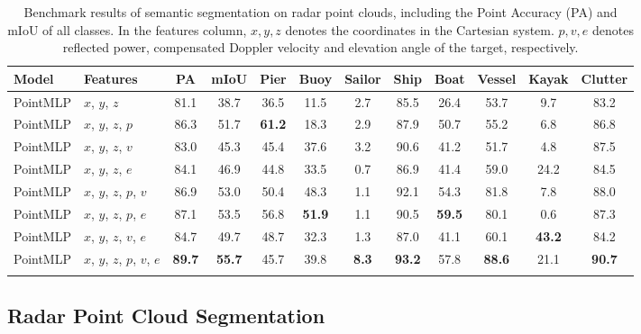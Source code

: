 \documentclass[lettersize,journal]{IEEEtran}
\begin{document}
\begin{table*}[!h]
\caption{Benchmark results of semantic segmentation on radar point clouds, including the Point Accuracy (PA) and mIoU of all classes. In the features column, $x, y, z$ denotes the coordinates in the Cartesian system. $p, v, e$ denotes reflected power, compensated Doppler velocity and elevation angle of the target, respectively.}
\center
\footnotesize
\begin{tabular}{ll|cc|cccccccc}
\toprule


\bf{Model} & \bf{Features} & \bf{PA} & \bf{mIoU} & \bf{Pier} & \bf{Buoy} & \bf{Sailor} & \bf{Ship} & \bf{Boat} & \bf{Vessel} & \bf{Kayak} & \bf{Clutter}  \\\midrule

PointMLP \cite{ma2022rethinking} & $x$, $y$, $z$ & 81.1 & 38.7 & 36.5 & 11.5 & 2.7 & 85.5 & 26.4 & 53.7 & 9.7 & 83.2\\
PointMLP \cite{ma2022rethinking} & $x$, $y$, $z$, $p$ & 86.3 & 51.7 & \textbf{61.2} & 18.3 & 2.9 & 87.9 & 50.7 & 55.2 & 6.8 & 86.8 \\
PointMLP \cite{ma2022rethinking} & $x$, $y$, $z$, $v$ & 83.0 &  45.3 & 45.4 & 37.6 & 3.2 & 90.6 & 41.2 & 51.7 & 4.8 & 87.5 \\
PointMLP \cite{ma2022rethinking} & $x$, $y$, $z$, $e$ & 84.1 &  46.9 & 44.8 & 33.5 & 0.7 & 86.9 & 41.4 & 59.0 & 24.2 & 84.5 \\
PointMLP \cite{ma2022rethinking} & $x$, $y$, $z$, $p$, $v$ & 86.9 & 53.0 & 50.4 & 48.3 & 1.1 & 92.1 & 54.3 & 81.8 & 7.8 & 88.0 \\
PointMLP \cite{ma2022rethinking} & $x$, $y$, $z$, $p$, $e$ & 87.1 & 53.5 & 56.8 & \textbf{51.9} & 1.1 & 90.5 & \textbf{59.5} & 80.1 & 0.6 & 87.3 \\
PointMLP \cite{ma2022rethinking} & $x$, $y$, $z$, $v$, $e$ & 84.7 & 49.7 & 48.7 & 32.3 & 1.3 & 87.0 & 41.1 & 60.1 & \textbf{43.2} & 84.2 \\
PointMLP \cite{ma2022rethinking} & $x$, $y$, $z$, $p$, $v$, $e$ & \textbf{89.7} & \textbf{55.7} & 45.7 & 39.8 & \textbf{8.3} & \textbf{93.2} & 57.8 & \textbf{88.6} & 21.1 & \textbf{90.7} \\
\bottomrule
\vspace{-2mm}
\end{tabular}

\label{tab:semantic_segmentation_PC}
\vspace{-2mm}
\end{table*}

\subsection{Radar Point Cloud Segmentation}
\end{document}
